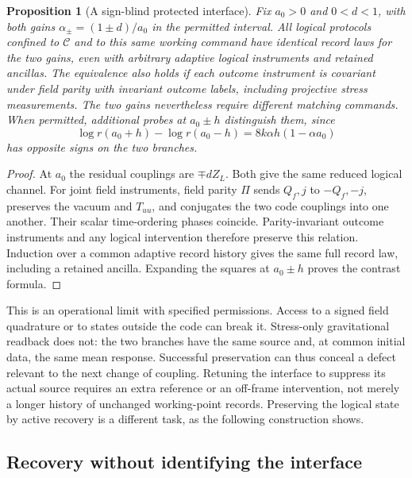 \documentclass[11pt]{article}
\newtheorem{proposition}[theorem]{Proposition}
\theoremstyle{definition}
\theoremstyle{remark}
\begin{document}
\begin{proposition}[A sign-blind protected interface]
\label{prop:quantum_selfblind}
Fix $a_0>0$ and $0<d<1$, with both gains
$\alpha_\pm=(1\pm d)/a_0$ in the permitted interval.
All logical protocols confined to $\mathcal C$ and to this same
working command have identical record laws for the two gains,
even with arbitrary adaptive logical instruments and retained ancillas.
The equivalence also holds if each outcome instrument is covariant under
field parity with invariant outcome labels, including projective stress
measurements. The two gains nevertheless
require different matching commands. When permitted, additional probes
at $a_0\pm h$ distinguish them, since
\begin{equation}
 \log r(a_0+h)-\log r(a_0-h)
 =8k\alpha h(1-\alpha a_0)
 \label{eq:off_frame_contrast}
\end{equation}
has opposite signs on the two branches.
\end{proposition}
\begin{proof}
At $a_0$ the residual couplings are $\mp dZ_L$. Both give the same
reduced logical channel. For joint field instruments, field parity
$\Pi$ sends $Q_f,j$ to $-Q_f,-j$, preserves the vacuum and
$T_{uu}$, and conjugates the two code couplings into one another.
Their scalar time-ordering phases coincide. Parity-invariant
outcome instruments and any logical intervention therefore preserve
this relation. Induction over a common adaptive record history gives
the same full record law, including a retained ancilla. Expanding
the squares at $a_0\pm h$ proves the contrast formula.
\end{proof}

This is an operational limit with specified permissions. Access to a
signed field quadrature or to states outside the code can break it.
Stress-only gravitational readback does not: the two branches have
the same source and, at common initial data, the same mean response.
Successful preservation can thus conceal a defect relevant to the
next change of coupling. Retuning the interface to suppress its actual
source requires an extra reference or an off-frame intervention, not
merely a longer history of unchanged working-point records. Preserving
the logical state by active recovery is a different task, as the
following construction shows.

\subsection{Recovery without identifying the interface}
\end{document}
